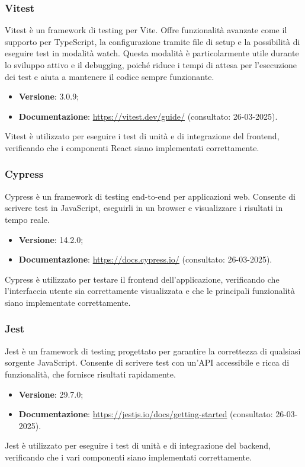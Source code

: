 \subsubsection{Vitest}
Vitest è un framework di testing per Vite. Offre funzionalità avanzate come il
supporto per TypeScript, la configurazione tramite file di setup e la
possibilità di eseguire test in modalità watch. Questa modalità è particolarmente utile
durante lo sviluppo attivo e il debugging, poiché riduce i tempi di attesa per
l'esecuzione dei test e aiuta a mantenere il codice sempre funzionante.
\begin{itemize}
    \item \textbf{Versione}: 3.0.9;
    \item \textbf{Documentazione}: \url{https://vitest.dev/guide/} (consultato:
          26-03-2025).
\end{itemize}
Vitest è utilizzato per eseguire i test di unità e di integrazione del frontend,
verificando che i componenti React siano implementati correttamente.

\subsubsection{Cypress}
Cypress è un framework di testing end-to-end per applicazioni web. Consente di
scrivere test in JavaScript, eseguirli in un browser e visualizzare i
risultati in tempo reale.
\begin{itemize}
    \item \textbf{Versione}: 14.2.0;
    \item \textbf{Documentazione}: \url{https://docs.cypress.io/} (consultato:
          26-03-2025).
\end{itemize}
Cypress è utilizzato per testare il frontend dell'applicazione, verificando che
l'interfaccia utente sia correttamente visualizzata e che le principali funzionalità
siano implementate correttamente.

\subsubsection{Jest}
Jest è un framework di testing progettato per garantire la correttezza di
qualsiasi sorgente JavaScript. Consente di scrivere test con un'API
accessibile e ricca di funzionalità, che fornisce risultati rapidamente.
\begin{itemize}
    \item \textbf{Versione}: 29.7.0;
    \item \textbf{Documentazione}: \url{https://jestjs.io/docs/getting-started} (consultato:
          26-03-2025).
\end{itemize}
Jest è utilizzato per eseguire i test di unità e di integrazione del backend,
verificando che i vari componenti siano implementati correttamente.